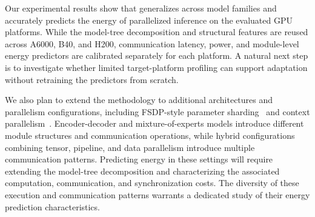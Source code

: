 Our experimental results show that \sys{} generalizes across model families and accurately predicts the energy of parallelized inference on the evaluated GPU platforms.
While the model-tree decomposition and structural features are reused across A6000, B40, and H200, communication latency, power, and module-level energy predictors are calibrated separately for each platform.
A natural next step is to investigate whether limited target-platform profiling can support adaptation without retraining the predictors from scratch.


We also plan to extend the \sys{} methodology to additional architectures and parallelism configurations, including FSDP-style parameter sharding~\cite{zhao2023fsdp} and context parallelism~\cite{liu2023ringattention,jacobs2023deepspeedulysses}.
Encoder-decoder and mixture-of-experts models introduce different module structures and communication operations, while hybrid configurations combining tensor, pipeline, and data parallelism introduce multiple communication patterns.
Predicting energy in these settings will require extending the model-tree decomposition and characterizing the associated computation, communication, and synchronization costs.
The diversity of these execution and communication patterns warrants a dedicated study of their energy prediction characteristics.